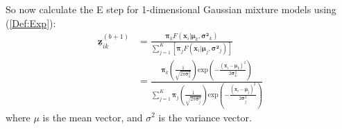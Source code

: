 \documentclass[12pt]{article}
\newcommand{\vect}[1]{\boldsymbol{#1}}
\newcommand{\mat}[1]{\underline{\boldsymbol{#1}}}
\renewcommand{\exp}[1]{\text{exp}\left(#1\right)}
\begin{document}
So now calculate the E step for 1-dimensional Gaussian mixture models using (\ref{Def:Exp}):
\begin{align} \label{Gau:Exp}
  \mat{z}_{ik}^{(b+1)} & = \frac{\vect{\pi}_kF(\vect{x}_i|\vect{\mu}_k, \vect{\sigma^2}_k)}
                                {\sum_{j=1}^K[\vect{\pi}_jF(\vect{x}_i|\vect{\mu}_j, \vect{\sigma^2}_j)]} \nonumber
                           \\
                       & = \frac{\vect{\pi}_k\left(\frac{1}{\sqrt{2\pi\vect{\sigma}_k^2}}\right)
                                  \exp{-\frac{(\vect{x}_i-\vect{\mu}_k)^2} {2\vect{\sigma}_k^2}}}
                                {\sum_{j=1}^K\vect{\pi}_j\left(\frac{1}{\sqrt{2\pi\vect{\sigma}_j^2}}\right)
                                  \exp{-\frac{(\vect{x}_i-\vect{\mu}_j)^2} {2\vect{\sigma}_j^2}}}
\end{align}
where $\mu$ is the mean vector, and $\sigma^2$ is the variance vector.
\end{document}
